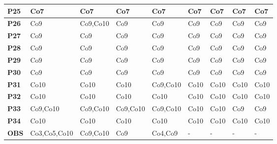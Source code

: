 \begin{table}[!htb]
\begin{tabular}{|M{1.0cm}|M{1.6cm}|M{1.6cm}|M{1.6cm}|M{1.6cm}|M{1.6cm}|M{1.6cm}|M{1.6cm}|M{1.6cm}|}
\textbf{P25}                   & Co7            & Co7            & Co7            & Co7            & Co7            & Co7            & Co7            & Co7            \\ \hline

\textbf{P26}                   & Co9            & Co9,Co10       & Co9            & Co9            & Co9            & Co9            & Co9            & Co9            \\ \hline

\textbf{P27}                   & Co9            & Co9            & Co9            & Co9            & Co9            & Co9            & Co9            & Co9            \\ \hline

\textbf{P28}                   & Co9            & Co9            & Co9            & Co9            & Co9            & Co9            & Co9            & Co9            \\ \hline

\textbf{P29}                   & Co9            & Co9            & Co9            & Co9            & Co9            & Co9            & Co9            & Co9            \\ \hline

\textbf{P30}                   & Co9            & Co9            & Co9            & Co9            & Co9            & Co9            & Co9            & Co9            \\ \hline

\textbf{P31}                   & Co10           & Co10           & Co10           & Co9,Co10       & Co10           & Co10           & Co10           & Co10           \\ \hline

\textbf{P32}                   & Co10           & Co10           & Co10           & Co10           & Co10           & Co10           & Co10           & Co10           \\ \hline

\textbf{P33}                   & Co9,Co10       & Co9,Co10       & Co9,Co10       & Co9,Co10       & Co10           & Co10           & Co9            & Co9            \\ \hline

\textbf{P34}                   & Co10           & Co10           & Co10           & Co10           & Co10           & Co10           & Co10           & Co10           \\ \hline

\textbf{OBS}                   & Co3,Co5,\newline Co10        & Co9,Co10       & Co9            & Co4,Co9        &   -             &        -        &      -          &      -          \\ \hline

\end{tabular}
\end{table}

